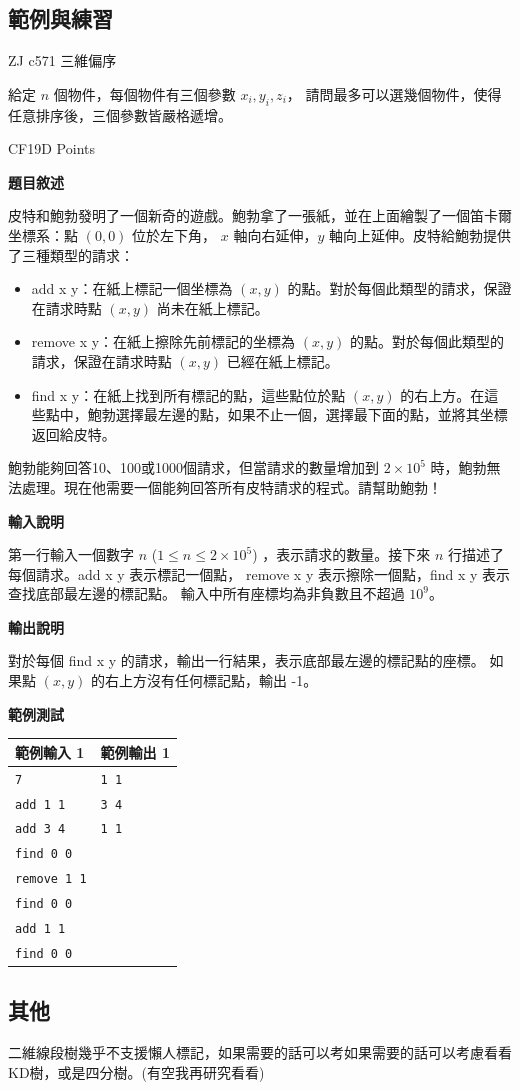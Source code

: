     \subsection{範例與練習}

    \problem ZJ c571 三維偏序

    給定 $n$ 個物件，每個物件有三個參數 $x_i, y_i, z_i$，
    請問最多可以選幾個物件，使得任意排序後，三個參數皆嚴格遞增。

    \problem CF19D Points

    \textbf{題目敘述}

    皮特和鮑勃發明了一個新奇的遊戲。鮑勃拿了一張紙，並在上面繪製了一個笛卡爾坐標系：點 $(0,0)$ 位於左下角，
    $x$ 軸向右延伸，$y$ 軸向上延伸。皮特給鮑勃提供了三種類型的請求：

    \begin{itemize}
        \item add x y：在紙上標記一個坐標為 $(x,y)$ 的點。對於每個此類型的請求，保證在請求時點 $(x,y)$ 尚未在紙上標記。
        \item remove x y：在紙上擦除先前標記的坐標為 $(x,y)$ 的點。對於每個此類型的請求，保證在請求時點 $(x,y)$ 已經在紙上標記。
        \item find x y：在紙上找到所有標記的點，這些點位於點 $(x,y)$ 的右上方。在這些點中，鮑勃選擇最左邊的點，如果不止一個，選擇最下面的點，並將其坐標返回給皮特。
    \end{itemize}
    
    鮑勃能夠回答10、100或1000個請求，但當請求的數量增加到 $2 \times 10^5$ 時，鮑勃無法處理。現在他需要一個能夠回答所有皮特請求的程式。請幫助鮑勃！

    \textbf{輸入說明}

    第一行輸入一個數字 $n$ ($1 \le n \le 2 \times 10^5$) ，表示請求的數量。接下來 $n$ 行描述了每個請求。add x y 表示標記一個點，
    remove x y 表示擦除一個點，find x y 表示查找底部最左邊的標記點。
    輸入中所有座標均為非負數且不超過 $10^9$。

    \textbf{輸出說明}

    對於每個 find x y 的請求，輸出一行結果，表示底部最左邊的標記點的座標。
    如果點 $(x,y)$ 的右上方沒有任何標記點，輸出 -1。

    \textbf{範例測試}

    \begin{tabular}{|m{7cm}|m{7cm}|}
        \hline
        範例輸入 1 & 範例輸出 1 \\
        \hline
        \verb|7| & \verb|1 1| \\
        \verb|add 1 1| & \verb|3 4| \\
        \verb|add 3 4| & \verb|1 1| \\
        \verb|find 0 0| & \\
        \verb|remove 1 1| & \\
        \verb|find 0 0| & \\
        \verb|add 1 1| & \\
        \verb|find 0 0| & \\
        \hline
    \end{tabular}

    \subsection{其他}

    二維線段樹幾乎不支援懶人標記，如果需要的話可以考如果需要的話可以考慮看看
    KD樹，或是四分樹。(有空我再研究看看)